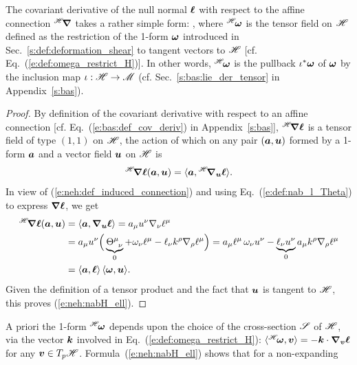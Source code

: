 \begin{prop}
\label{p:neh:Hnab_l}
The covariant derivative of the null normal $\bm{\ell}$ with respect to the affine
connection ${}^{\mathscr{H}}\!\bm{\nabla}$ takes a rather simple form:
\be \label{e:neh:nabH_ell}
   \encadre{ {}^\Hor\!\wnab \wl = \wl \otimes {}^\Hor\!\w{\omega} },
\ee
where ${}^{\mathscr{H}}\!\bm{\omega}$ is the tensor field on $\mathscr{H}$
defined as the restriction of the 1-form $\bm{\omega}$
introduced in Sec.~\ref{s:def:deformation_shear}
to tangent vectors to $\mathscr{H}$ [cf. Eq.~(\ref{e:def:omega_restrict_H})].
In other words, ${}^{\mathscr{H}}\!\bm{\omega}$ is the pullback $\iota^*\bm{\omega}$ of
$\bm{\omega}$ by the inclusion map $\iota: \mathscr{H} \to \mathscr{M}$ (cf. Sec.~\ref{s:bas:lie_der_tensor}
in Appendix~\ref{s:bas}).
\end{prop}
\begin{proof}
By definition of the covariant derivative with respect to an
affine connection [cf. Eq.~(\ref{e:bas:def_cov_deriv}) in Appendix~\ref{s:bas}],
${}^{\mathscr{H}}\!\bm{\nabla} \bm{\ell}$ is a tensor field of type $(1,1)$ on $\mathscr{H}$,
the action of which on any pair
$(\bm{a}, \bm{u})$ formed by a 1-form $\bm{a}$ and a vector field $\bm{u}$
on $\mathscr{H}$ is
\[
    {}^{\mathscr{H}}\!\bm{\nabla} \bm{\ell} (\bm{a}, \bm{u}) = \langle \bm{a}, {}^{\mathscr{H}}\!\bm{\nabla}_{\bm{u}} \bm{\ell} \rangle .
\]
In view of (\ref{e:neh:def_induced_connection}) and using Eq.~(\ref{e:def:nab_l_Theta})
to express $\bm{\nabla}\bm{\ell}$, we get
\begin{align}
    {}^{\mathscr{H}}\!\bm{\nabla} \bm{\ell} (\bm{a}, \bm{u}) & = \langle \bm{a}, \bm{\nabla}_{\bm{u}} \bm{\ell} \rangle
       = a_\mu u^\nu \nabla_\nu \ell^\mu \nonumber \\
        & = a_\mu u^\nu \Big( \underbrace{\Theta^\mu_{\ \, \nu}}_{0} + \omega_\nu \ell^\mu
            - \ell_\nu k^\rho \nabla_\rho \ell^\mu \Big)
         = a_\mu \ell^\mu \, \omega_\nu u^\nu - \underbrace{\ell_\nu u^\nu}_{0}
            a_\mu k^\rho \nabla_\rho \ell^\mu \nonumber \\
         & = \langle \bm{a}, \bm{\ell} \rangle \, \langle \bm{\omega}, \bm{u} \rangle . \nonumber
\end{align}
Given the definition of a tensor product and the fact that $\bm{u}$ is tangent to $\mathscr{H}$,
this proves (\ref{e:neh:nabH_ell}).
\end{proof}
A priori the 1-form ${}^{\mathscr{H}}\!\bm{\omega}$ depends upon the choice of the cross-section $\mathscr{S}$
of $\mathscr{H}$, via the vector $\bm{k}$ involved in Eq.~(\ref{e:def:omega_restrict_H}):
$\langle {}^{\mathscr{H}}\!\bm{\omega}, \bm{v} \rangle = - \bm{k} \cdot\bm{\nabla}_{\bm{v}} \bm{\ell}$
for any $\bm{v}\in T_p\mathscr{H}$. Formula~(\ref{e:neh:nabH_ell}) shows that for a non-expanding
